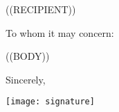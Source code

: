 \documentclass{letter}
\begin{document}
\begin{letter}{((RECIPIENT))}
\opening{To whom it may concern:}
((BODY))
\closing{Sincerely,}
\texttt{[image: signature]}
\end{letter}
\end{document}
